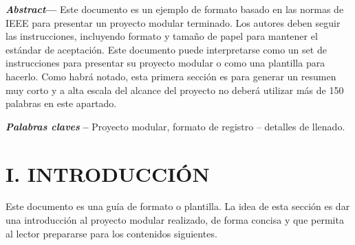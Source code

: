﻿\documentclass[10pt,twocolumn]{article}
\begin{document}
\noindent\textbf{\textit{Abstract}}\textbf{---} Este documento es un ejemplo de formato basado en las normas de IEEE para presentar un proyecto modular terminado. Los autores deben seguir las instrucciones, incluyendo formato y tamaño de papel para mantener el estándar de aceptación. Este documento puede interpretarse como un set de instrucciones para presentar su proyecto modular o como una plantilla para hacerlo. Como habrá notado, esta primera sección es para generar un resumen muy corto y a alta escala del alcance del proyecto no deberá utilizar más de 150 palabras en este apartado.

\noindent\textbf{\textit{Palabras claves}}\textbf{ -- }Proyecto modular, formato de registro -- detalles de llenado.

\section*{I. INTRODUCCIÓN}
Este documento es una guía de formato o plantilla. La idea de esta sección es dar una introducción al proyecto modular realizado, de forma concisa y que permita al lector prepararse para los contenidos siguientes.
\end{document}
